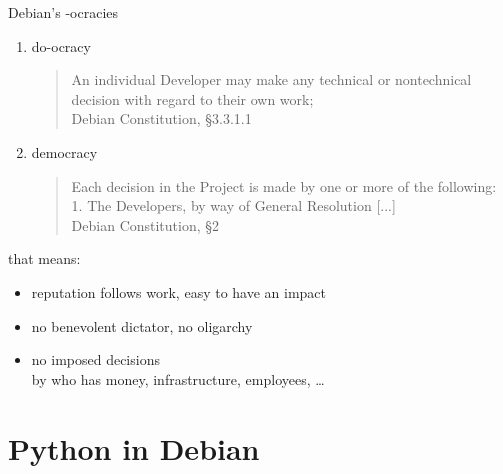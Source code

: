 \documentclass[]{beamer}
\begin{document}
\begin{frame}{Debian's -ocracies}
  \begin{enumerate}
  \item \alert{do-ocracy}
    \begin{quotation}
      An individual Developer may make any technical or nontechnical decision
      with regard to their own work;\\
      \hfill {\small\normalfont Debian Constitution, §3.3.1.1}
    \end{quotation}
  \item \alert{democracy}
    \begin{quotation}
      Each decision in the Project is made by one or more of the following: \\
      1. The Developers, by way of General Resolution [...] \\
      \hfill {\small\normalfont Debian Constitution, §2}
    \end{quotation}
  \end{enumerate}

  that means:
  \begin{itemize}
  \item reputation follows work, easy to have an impact
  \item no benevolent dictator, no oligarchy
  \item \alert{no imposed decisions} \\
    {\small by who has money, infrastructure, employees, \ldots}
  \end{itemize}
\end{frame}


\section{Python in Debian}
\end{document}
